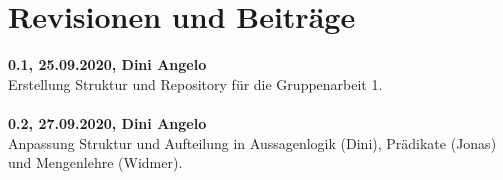\newpage

\section{Revisionen und Beiträge}

\textbf{0.1, 25.09.2020, Dini Angelo}\\
Erstellung Struktur und Repository für die Gruppenarbeit 1.
\\\\
\textbf{0.2, 27.09.2020, Dini Angelo}\\
Anpassung Struktur und Aufteilung in Aussagenlogik (Dini), Prädikate (Jonas) und Mengenlehre (Widmer).
\\\\
